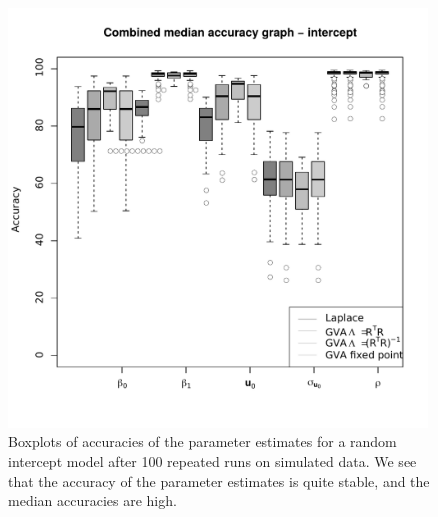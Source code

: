 \begin{figure}[h]
	\begin{center}
		\includegraphics[width=0.99\textwidth]{code/results/median_accuracy_combined_intercept.pdf}
		\bigskip
		\caption{Boxplots of accuracies of the parameter estimates for a random intercept model after 100 repeated
							runs on simulated data. We see that the accuracy of the parameter estimates is quite stable,
							and the median accuracies are high.}
		\label{fig:median_accuracy_intercept}
	\end{center}
\end{figure}
		
